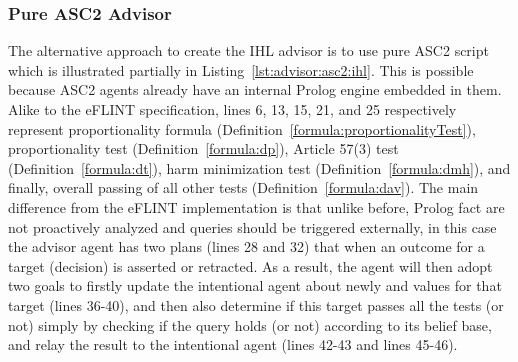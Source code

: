 \subsubsection{Pure ASC2 Advisor}
The alternative approach to create the IHL advisor is to use pure ASC2 script which is illustrated partially in Listing~\ref{lst:advisor:asc2:ihl}. This is possible because ASC2 agents already have an internal Prolog engine embedded in them. Alike to the eFLINT specification, lines 6, 13, 15, 21, and 25 respectively represent proportionality formula (Definition~\ref{formula:proportionalityTest}), proportionality test (Definition~\ref{formula:dp}), Article 57(3) test (Definition~\ref{formula:dt}), harm minimization test (Definition~\ref{formula:dmh}), and finally, overall passing of all other tests (Definition~\ref{formula:dav}). The main difference from the eFLINT implementation is that unlike before, Prolog fact are  not proactively analyzed and queries should be triggered externally, in this case the advisor agent has two plans (lines 28 and 32) that when an outcome for a target (decision) is asserted or retracted. As a result, the agent will then adopt two goals to firstly update the intentional agent about newly  and  values for that target (lines 36-40), and then also determine if this target passes all the tests (or not) simply by checking if the query  holds (or not) according to its belief base, and relay the result to the intentional agent (lines 42-43 and lines 45-46).



